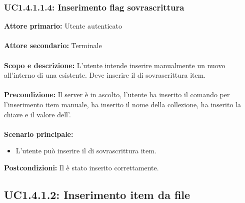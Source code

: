 \documentclass{scalatekids-article}
\begin{document}
\subsubsection{UC1.4.1.1.4: Inserimento flag sovrascrittura}

\textbf{Attore primario:} Utente autenticato\\ \\
\textbf{Attore secondario:} Terminale\\ \\
\textbf{Scopo e descrizione:} L'utente intende inserire manualmente un nuovo  all'interno di una  esistente. Deve inserire il  di sovrascrittura item.\\ \\
\textbf{Precondizione:} Il server è in ascolto, l'utente ha inserito il comando per l'inserimento item manuale, ha inserito il nome della collezione, ha inserito la chiave e il valore dell'.\\ \\
\textbf{Scenario principale:}
\begin{itemize}
  \item L'utente può inserire il  di sovrascrittura item. %
\end{itemize}
\textbf{Postcondizioni:} Il  è stato inserito correttamente.

\subsection{UC1.4.1.2: Inserimento item da file}
\end{document}
